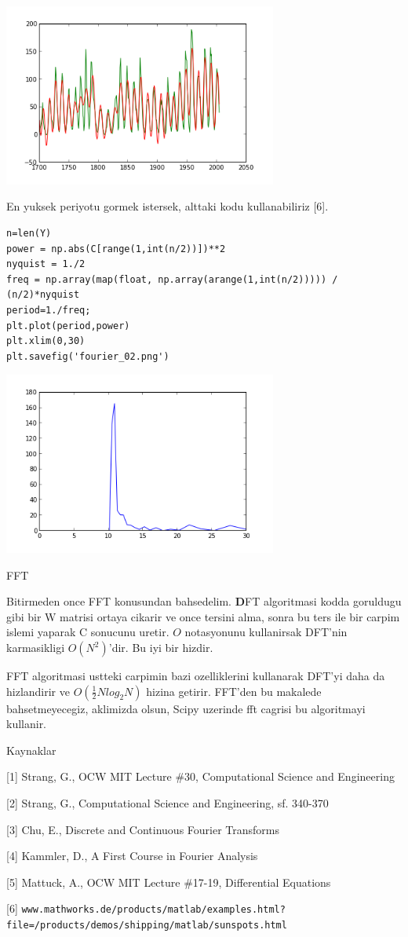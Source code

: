 \documentclass[12pt,fleqn]{article}\usepackage{../common}
\begin{document}
\includegraphics[height=6cm]{fourier_1.png}

En yuksek periyotu gormek istersek, alttaki kodu kullanabiliriz [6].

\begin{verbatim}
n=len(Y)
power = np.abs(C[range(1,int(n/2))])**2
nyquist = 1./2
freq = np.array(map(float, np.array(arange(1,int(n/2))))) / (n/2)*nyquist
period=1./freq;
plt.plot(period,power)
plt.xlim(0,30)
plt.savefig('fourier_02.png')
\end{verbatim}

\includegraphics[height=6cm]{fourier_02.png}

FFT

Bitirmeden once FFT konusundan bahsedelim. $\textbf{D}$FT algoritmasi
kodda goruldugu gibi bir W matrisi ortaya cikarir ve once tersini
alma, sonra bu ters ile bir carpim islemi yaparak C sonucunu
uretir. $O$ notasyonunu kullanirsak DFT'nin karmasikligi
$O(N^2)$'dir. Bu iyi bir hizdir.

FFT algoritmasi ustteki carpimin bazi ozelliklerini kullanarak DFT'yi
daha da hizlandirir ve $O(\frac{1}{2}Nlog_2N)$ hizina getirir. FFT'den
bu makalede bahsetmeyecegiz, aklimizda olsun, Scipy uzerinde fft
cagrisi bu algoritmayi kullanir.

Kaynaklar

[1] Strang, G., OCW MIT Lecture \#30, Computational Science and Engineering

[2] Strang, G., Computational Science and Engineering, sf. 340-370

[3] Chu, E., Discrete and Continuous Fourier Transforms

[4] Kammler, D., A First Course in Fourier Analysis

[5] Mattuck, A., OCW MIT Lecture \#17-19, Differential Equations

[6] \verb!www.mathworks.de/products/matlab/examples.html?file=/products/demos/shipping/matlab/sunspots.html!
\end{document}
